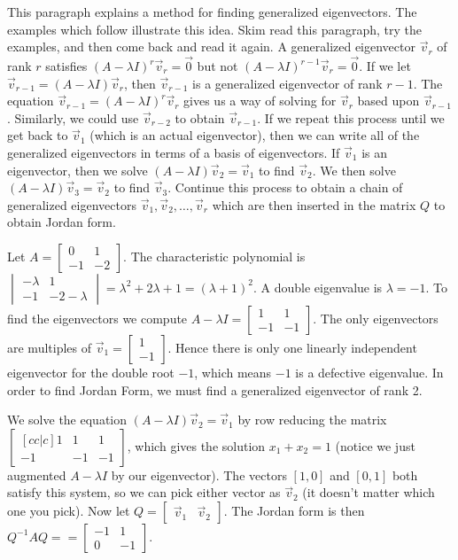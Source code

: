 This paragraph explains a method for finding generalized eigenvectors.  The examples which follow illustrate this idea. Skim read this paragraph, try the examples, and then come back and read it again. A generalized eigenvector $\vec v_r$ of rank $r$ satisfies $(A-\lambda I)^r\vec v_r=\vec 0$ but not $(A-\lambda I)^{r-1}\vec v_r=\vec 0$.  If we let $\vec v_{r-1}= (A-\lambda I)\vec v_r$, then $\vec v_{r-1}$ is a generalized eigenvector of rank $r-1$. The equation $\vec v_{r-1}=(A-\lambda I)^r\vec v_r$ gives us a way of solving for $\vec v_{r}$ based upon $\vec v_{r-1}$. Similarly, we could use $\vec v_{r-2}$ to obtain $\vec v_{r-1}$.   If we repeat this process until we get back to $\vec v_1$ (which is an actual eigenvector), then we can write all of the generalized eigenvectors in terms of a basis of eigenvectors. If $\vec v_1$ is an eigenvector, then we solve $(A-\lambda I)\vec v_2 =\vec v_1$ to find $\vec v_2$. We then solve  $(A-\lambda I)\vec v_3 =\vec v_2$ to find $\vec v_3$. Continue this process to obtain a chain of generalized eigenvectors $\vec v_1, \vec v_2, \ldots, \vec v_r$ which are then inserted in the matrix $Q$ to obtain Jordan form.

\begin{example}
Let $A=\begin {bmatrix} 0&1\\-1&-2\end {bmatrix}$. The characteristic polynomial is $\begin {vmatrix} -\lambda&1\\-1&-2-\lambda\end {vmatrix}= \lambda^2+2\lambda+1=(\lambda+1)^2$. A double eigenvalue is $\lambda=-1$.  To find the eigenvectors we compute {$A-\lambda I = \begin {bmatrix} 1&1\\-1&-1\end {bmatrix} $}. The only eigenvectors are multiples of $\vec v_1 = \begin {bmatrix} 1\\-1\end {bmatrix}$. Hence there is only one linearly independent eigenvector for the double root $-1$, which means $-1$ is a defective eigenvalue. In order to find Jordan Form, we must find a generalized eigenvector of rank 2. 

We solve the equation 
$(A-\lambda I)\vec v_2=\vec v_1$ by row reducing the matrix 
$\begin {bmatrix}[cc|c] 1&1&1\\-1&-1&-1\end {bmatrix}$, which gives the solution $x_1+x_2=1$ (notice we just augmented $A-\lambda I$ by our eigenvector).  The vectors $[1,0]$ and $[0,1]$ both satisfy this system, so we can pick either vector as $\vec v_2$ (it doesn't matter which one you pick). Now let $Q=\begin{bmatrix}\vec v_1 &\vec v_2\end{bmatrix}$. The Jordan form is then $Q^{-1}AQ = =\begin {bmatrix} -1&1\\0&-1\end {bmatrix}$.  
\end{example}


